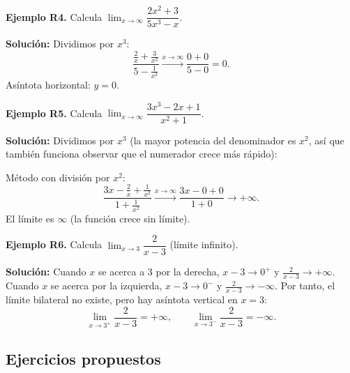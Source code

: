 \documentclass[12pt, letterpaper]{article}
\begin{document}
\textbf{Ejemplo R4.} Calcula $\lim_{x \to \infty} \dfrac{2x^2 + 3}{5x^3 - x}$.

\begin{cuadrosolucion}
  \textbf{Solución:} Dividimos por $x^3$:
  $$\frac{\frac{2}{x} + \frac{3}{x^3}}{5 - \frac{1}{x^2}} \xrightarrow{x \to \infty} \frac{0 + 0}{5 - 0} = 0.$$
  Asíntota horizontal: $y = 0$.
\end{cuadrosolucion}
\textbf{Ejemplo R5.} Calcula $\lim_{x \to \infty} \dfrac{3x^3 - 2x + 1}{x^2 + 1}$.

\begin{cuadrosolucion}
  \textbf{Solución:} Dividimos por $x^3$ (la mayor potencia del denominador es $x^2$, así que también funciona observar que el numerador crece más rápido):

  Método con división por $x^2$:
  $$\frac{3x - \frac{2}{x} + \frac{1}{x^2}}{1 + \frac{1}{x^2}} \xrightarrow{x \to \infty} \frac{3x - 0 + 0}{1 + 0} \to +\infty.$$
  El límite es $\infty$ (la función crece sin límite).
\end{cuadrosolucion}

\textbf{Ejemplo R6.} Calcula $\lim_{x \to 3} \dfrac{2}{x - 3}$ (límite infinito).

\begin{cuadrosolucion}
  \textbf{Solución:} Cuando $x$ se acerca a 3 por la derecha, $x - 3 \to 0^+$ y $\frac{2}{x-3} \to +\infty$. Cuando $x$ se acerca por la izquierda, $x - 3 \to 0^-$ y $\frac{2}{x-3} \to -\infty$. Por tanto, el límite bilateral no existe, pero hay asíntota vertical en $x = 3$:
  $$\lim_{x \to 3^+} \frac{2}{x - 3} = +\infty, \qquad \lim_{x \to 3^-} \frac{2}{x - 3} = -\infty.$$
\end{cuadrosolucion}

\subsection{Ejercicios propuestos}
\end{document}
